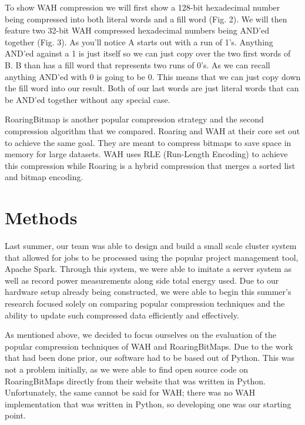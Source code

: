 \documentclass{article}
\begin{document}
To show WAH compression we will first show a 128-bit hexadecimal number being compressed into both literal words and a fill word (Fig. 2). We will then feature two 32-bit WAH compressed hexadecimal numbers being AND’ed together (Fig. 3). As you’ll notice A starts out with a run of 1’s. Anything AND’ed against a 1 is just itself so we can just copy over the two first words of B. B than has a fill word that represents two runs of 0’s. As we can recall anything AND’ed with 0 is going to be 0. This means that we can just copy down the fill word into our result. Both of our last words are just literal words that can be AND’ed together without any special case. \par



RoaringBitmap is another popular compression strategy and the second compression algorithm that we compared. Roaring and WAH at their core set out to achieve the same goal. They are meant to compress bitmaps to save space in memory for large datasets. WAH uses RLE (Run-Length Encoding) to achieve this compression while Roaring is a hybrid compression that merges a sorted list and bitmap encoding. \par

%
%
\section{Methods}
Last summer, our team was able to design and build a small scale cluster system that allowed for jobs to be processed using the popular project management tool, Apache Spark. Through this system, we were able to imitate a server system as well as record power measurements along side total energy used. Due to our hardware setup already being constructed, we were able to begin this summer's research focused solely on comparing popular compression techniques and the ability to update such compressed data efficiently and effectively. \par 
As mentioned above, we decided to focus ourselves on the evaluation of the popular compression techniques of WAH and RoaringBitMaps. Due to the work that had been done prior, our software had to be based out of Python. This was not a problem initially, as we were able to find open source code on RoaringBitMaps directly from their website that was written in Python. Unfortunately, the same cannot be said for WAH; there was no WAH implementation that was written in Python, so developing one was our starting point. \par
\end{document}
